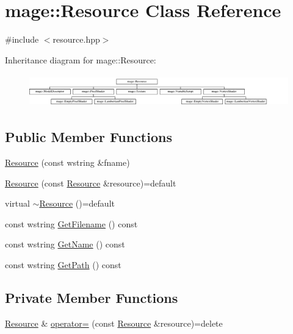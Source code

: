\hypertarget{classmage_1_1_resource}{}\section{mage\+:\+:Resource Class Reference}
\label{classmage_1_1_resource}


{\ttfamily \#include $<$resource.\+hpp$>$}

Inheritance diagram for mage\+:\+:Resource\+:\begin{figure}[H]
\begin{center}
\leavevmode
\includegraphics[height=1.428571cm]{classmage_1_1_resource}
\end{center}
\end{figure}
\subsection*{Public Member Functions}
\begin{DoxyCompactItemize}
\item 
\hyperlink{classmage_1_1_resource_a3a1972d0ea30505d3a27e566aeb74834}{Resource} (const wstring \&fname)
\item 
\hyperlink{classmage_1_1_resource_ab847b406a175fb1fb43713f58854bf81}{Resource} (const \hyperlink{classmage_1_1_resource}{Resource} \&resource)=default
\item 
virtual \hyperlink{classmage_1_1_resource_a26cea6261aac321d95ac745703f1a3e8}{$\sim$\+Resource} ()=default
\item 
const wstring \hyperlink{classmage_1_1_resource_a1f05385b8c05646989689fc04847a816}{Get\+Filename} () const
\item 
const wstring \hyperlink{classmage_1_1_resource_a6c253886da9b0c3a52ca7a38ba448d74}{Get\+Name} () const
\item 
const wstring \hyperlink{classmage_1_1_resource_a82a540b610f04adc251771ec6fe8e535}{Get\+Path} () const
\end{DoxyCompactItemize}
\subsection*{Private Member Functions}
\begin{DoxyCompactItemize}
\item 
\hyperlink{classmage_1_1_resource}{Resource} \& \hyperlink{classmage_1_1_resource_ad8fa57f37eb253b90d18d33383b12875}{operator=} (const \hyperlink{classmage_1_1_resource}{Resource} \&resource)=delete
\end{DoxyCompactItemize}
